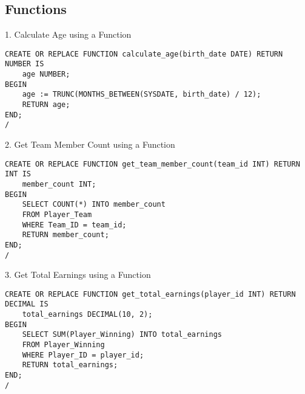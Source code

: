 \subsection{Functions}
\hrulefill

1. Calculate Age using a  Function 

\begin{lstlisting}[caption={ Query 1},label={lst:q-1}]
    CREATE OR REPLACE FUNCTION calculate_age(birth_date DATE) RETURN NUMBER IS
    age NUMBER;
BEGIN
    age := TRUNC(MONTHS_BETWEEN(SYSDATE, birth_date) / 12);
    RETURN age;
END;
/

\end{lstlisting}

2. Get Team Member Count using a Function

\begin{lstlisting}[caption={ Query 2},label={lst:q-2}]
    CREATE OR REPLACE FUNCTION get_team_member_count(team_id INT) RETURN INT IS
    member_count INT;
BEGIN
    SELECT COUNT(*) INTO member_count
    FROM Player_Team
    WHERE Team_ID = team_id;
    RETURN member_count;
END;
/
\end{lstlisting}

3. Get Total Earnings using a Function
\begin{lstlisting}[caption={ Query 3},label={lst:q-3}]
    CREATE OR REPLACE FUNCTION get_total_earnings(player_id INT) RETURN DECIMAL IS
    total_earnings DECIMAL(10, 2);
BEGIN
    SELECT SUM(Player_Winning) INTO total_earnings
    FROM Player_Winning
    WHERE Player_ID = player_id;
    RETURN total_earnings;
END;
/

\end{lstlisting}